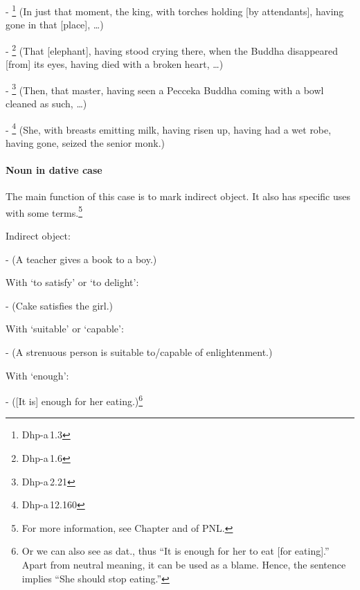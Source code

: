 \begin{compactenum}[(1)]
- \footnote{Dhp-a\,1.3} (In just that moment, the king, with torches holding [by attendants], having gone in that [place], \ldots)\par
- \footnote{Dhp-a\,1.6} (That [elephant], having stood crying there, when the Buddha disappeared [from] its eyes, having died with a broken heart, \ldots)\par
- \footnote{Dhp-a\,2.21} (Then, that master, having seen a Pecceka Buddha coming with a bowl cleaned as such, \ldots)\par
- \footnote{Dhp-a\,12.160} (She, with breasts emitting milk, having risen up, having had a wet robe, having gone, seized the senior monk.)\par
\end{compactenum}

\paragraph*{Noun in dative case} The main function of this case is to mark indirect object. It also has specific uses with some terms.\footnote{For more information, see Chapter  and  of PNL.}
\begin{compactenum}[(1)]
\item Indirect object:\par
-  (A teacher gives a book to a boy.)\par
\item With `to satisfy' or `to delight':\par
-  (Cake satisfies the girl.)\par
\item With `suitable' or `capable':\par
-  (A strenuous person is suitable to/capable of enlightenment.)\par
\item With `enough':\par
-  ([It is] enough for her eating.)\footnote{Or we can also see  as dat., thus ``It is enough for her to eat [for eating].'' Apart from neutral meaning, it can be used as a blame. Hence, the sentence implies ``She should stop eating.''}\par
\end{compactenum}

